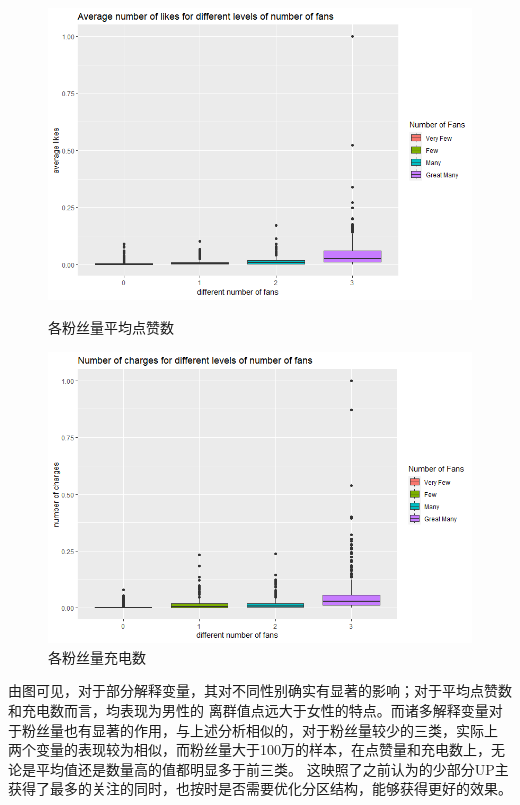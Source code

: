 \documentclass{ctexart}
\begin{document}
\begin{figure}[H]
    \centering
    \begin{minipage}[t]{0.48\textwidth}
        \centering
        \includegraphics[width=\textwidth]{EDA/av_like_fans_boxplot.png}
        \caption{各粉丝量平均点赞数}
    \end{minipage}
    \begin{minipage}[t]{0.48\textwidth}
        \centering
        \includegraphics[width=\textwidth]{EDA/num_charge_fan_boxplot.png}
        \caption{各粉丝量充电数}
    \end{minipage}
\end{figure}

由图可见，对于部分解释变量，其对不同性别确实有显著的影响；对于平均点赞数和充电数而言，均表现为男性的
离群值点远大于女性的特点。而诸多解释变量对于粉丝量也有显著的作用，与上述分析相似的，对于粉丝量较少的三类，实际上
两个变量的表现较为相似，而粉丝量大于100万的样本，在点赞量和充电数上，无论是平均值还是数量高的值都明显多于前三类。
这映照了之前认为的少部分UP主获得了最多的关注的同时，也按时是否需要优化分区结构，能够获得更好的效果。
\end{document}

